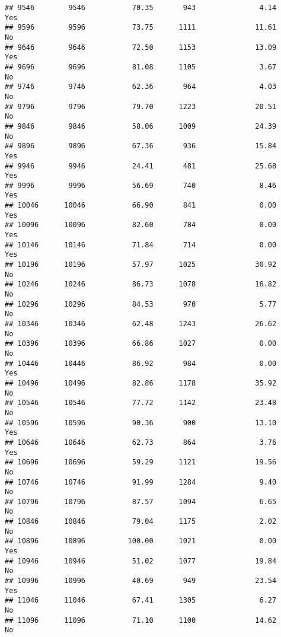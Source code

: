 \documentclass[
]{article}
\begin{document}
\begin{verbatim}
## 9546        9546           70.35       943               4.14               Yes
## 9596        9596           73.75      1111              11.61                No
## 9646        9646           72.50      1153              13.09               Yes
## 9696        9696           81.08      1105               3.67                No
## 9746        9746           62.36       964               4.03                No
## 9796        9796           79.70      1223              20.51                No
## 9846        9846           58.06      1009              24.39                No
## 9896        9896           67.36       936              15.84               Yes
## 9946        9946           24.41       481              25.68               Yes
## 9996        9996           56.69       740               8.46               Yes
## 10046      10046           66.90       841               0.00               Yes
## 10096      10096           82.60       784               0.00               Yes
## 10146      10146           71.84       714               0.00               Yes
## 10196      10196           57.97      1025              30.92                No
## 10246      10246           86.73      1078              16.82                No
## 10296      10296           84.53       970               5.77                No
## 10346      10346           62.48      1243              26.62                No
## 10396      10396           66.86      1027               0.00                No
## 10446      10446           86.92       984               0.00               Yes
## 10496      10496           82.86      1178              35.92                No
## 10546      10546           77.72      1142              23.48                No
## 10596      10596           90.36       900              13.10               Yes
## 10646      10646           62.73       864               3.76               Yes
## 10696      10696           59.29      1121              19.56                No
## 10746      10746           91.99      1284               9.40                No
## 10796      10796           87.57      1094               6.65                No
## 10846      10846           79.04      1175               2.02                No
## 10896      10896          100.00      1021               0.00               Yes
## 10946      10946           51.02      1077              19.84                No
## 10996      10996           40.69       949              23.54               Yes
## 11046      11046           67.41      1305               6.27                No
## 11096      11096           71.10      1100              14.62                No

\end{verbatim}
\end{document}
